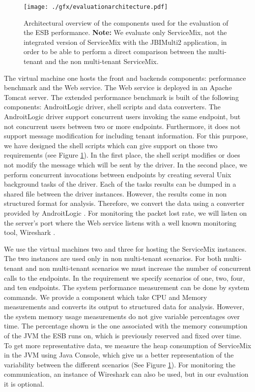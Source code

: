 \begin{figure}[htb]
	\centering
		\texttt{[image: ./gfx/evaluationarchitecture.pdf]}
	\caption[ESB Performance Evaluation Architecture]{Architectural overview of the components used for the evaluation of the \ac{ESB} performance. \textbf{Note:} We evaluate only ServiceMix, not the integrated version of ServiceMix with the JBIMulti2 application, in order to be able to perform a direct comparison between the multi-tenant and the non multi-tenant ServiceMix.}
	\label{fig:evaluationarchitecture}
\end{figure}


The virtual machine one hosts the front and backends components: performance benchmark and the Web service. The Web service is deployed in an Apache Tomcat server. The extended performance benchmark is built of the following components: AndroitLogic driver, shell scripts and data converters. The AndroitLogic driver support concurrent users invoking the same endpoint, but not concurrent users between two or more endpoints. Furthermore, it does not support message modification for including tenant information. For this purpose, we have designed the shell scripts which can give support on those two requirements (see Figure \ref{fig:evaluationarchitecture}). In the first place, the shell script modifies or does not modify the message which will be sent by the driver. In the second place, we perform concurrent invocations between endpoints by creating several Unix background tasks of the driver. Each of the tasks results can be dumped in a shared file between the driver instances. However, the results come in non structured format for analysis. Therefore, we convert the data using a converter provided by AndroitLogic \cite{androit2012}. For monitoring the packet lost rate, we will listen on the server's port where the Web service listens with a well known monitoring tool, Wireshark \cite{wireshark}.

We use the virtual machines two and three for hosting the ServiceMix instances. The two instances are used only in non multi-tenant scenarios. For both multi-tenant and non multi-tenant scenarios we must increase the number of concurrent calls to the endpoints. In the requirement we specify scenarios of one, two, four, and ten endpoints. The system performance measurement can be done by system commands. We provide a component which take CPU and Memory measurements and converts its output to structured data for analysis. However, the system memory usage measurements do not give variable percentages over time. The percentage shown is the one associated with the memory consumption of the JVM the \ac{ESB} runs on, which is previously reserved and fixed over time. To get more representative data, we measure the heap consumption of ServiceMix in the JVM using Java Console, which give us a better representation of the variability between the different scenarios (See Figure \ref{fig:evaluationarchitecture}). For monitoring the communication, an instance of Wireshark can also be used, but in our evaluation it is optional.


\FloatBarrier
\clearpage